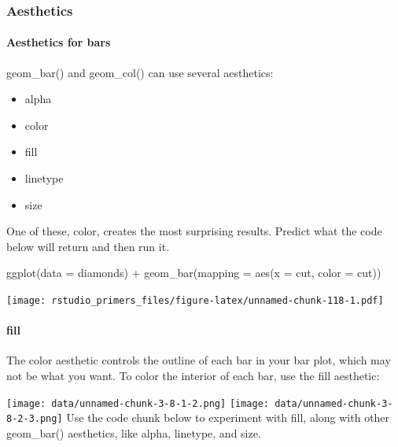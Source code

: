 \documentclass[
]{article}
\newenvironment{Shaded}{\begin{snugshade}}{\end{snugshade}}
\newcommand{\AttributeTok}[1]{\textcolor[rgb]{0.77,0.63,0.00}{#1}}
\newcommand{\FunctionTok}[1]{\textcolor[rgb]{0.00,0.00,0.00}{#1}}
\newcommand{\NormalTok}[1]{#1}
\newcommand{\SpecialCharTok}[1]{\textcolor[rgb]{0.00,0.00,0.00}{#1}}
\providecommand{\tightlist}{%
  \setlength{\itemsep}{0pt}\setlength{\parskip}{0pt}}
\begin{document}
\hypertarget{aesthetics-1}{%
\subsubsection{Aesthetics}\label{aesthetics-1}}

\hypertarget{aesthetics-for-bars}{%
\paragraph{Aesthetics for bars}\label{aesthetics-for-bars}}

geom\_bar() and geom\_col() can use several aesthetics:

\begin{itemize}
\tightlist
\item
  alpha
\item
  color
\item
  fill
\item
  linetype
\item
  size
\end{itemize}

One of these, color, creates the most surprising results. Predict what
the code below will return and then run it.

\begin{Shaded}
\begin{Highlighting}[]
\FunctionTok{ggplot}\NormalTok{(}\AttributeTok{data =}\NormalTok{ diamonds) }\SpecialCharTok{+}
  \FunctionTok{geom\_bar}\NormalTok{(}\AttributeTok{mapping =} \FunctionTok{aes}\NormalTok{(}\AttributeTok{x =}\NormalTok{ cut, }\AttributeTok{color =}\NormalTok{ cut))}
\end{Highlighting}
\end{Shaded}

\texttt{[image: rstudio\_primers\_files/figure-latex/unnamed-chunk-118-1.pdf]}

\hypertarget{fill}{%
\paragraph{fill}\label{fill}}

The color aesthetic controls the outline of each bar in your bar plot,
which may not be what you want. To color the interior of each bar, use
the fill aesthetic:

\texttt{[image: data/unnamed-chunk-3-8-1-2.png]}
\texttt{[image: data/unnamed-chunk-3-8-2-3.png]} Use the code chunk
below to experiment with fill, along with other geom\_bar() aesthetics,
like alpha, linetype, and size.
\end{document}
